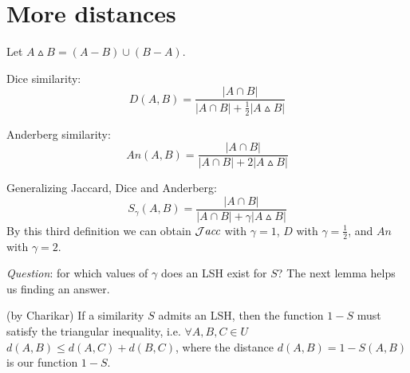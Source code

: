 
\section{More distances}
	Let $A \vartriangle B = (A-B) \cup (B-A)$.

	Dice similarity:
	\begin{equation}
	\displaystyle D(A, B) = \frac{|A\cap B|}{|A\cap B| + \frac{1}{2}|A\vartriangle B|}
	\end{equation}
	
	Anderberg similarity:
	\begin{equation}
	\displaystyle An(A, B) = \frac{|A\cap B|}{|A\cap B| + 2|A\vartriangle B|}
	\end{equation}
	
	Generalizing Jaccard, Dice and Anderberg: 
	\begin{equation}
	\displaystyle S_\gamma(A, B) = \frac{|A\cap B|}{|A\cap B| + \gamma|A\vartriangle B|}
	\end{equation}
	By this third definition we can obtain $\mathcal{J}\textit{acc}$ with $\gamma=1$, $D$ with $\gamma=\frac{1}{2}$, and $An$ with $\gamma=2$.
	
	\textit{Question}: for which values of $\gamma$ does an LSH exist for $S$? The next lemma helps us finding an answer.
	
	\lem (by Charikar) If a similarity $S$ admits an LSH, then the function $1-S$ must satisfy the triangular inequality, i.e. $\forall A,B,C \in U$ \\ $d(A,B) \leq d(A,C) + d(B,C)$, where the distance $d(A,B) = 1-S(A,B)$ is our function $1-S$.
	
